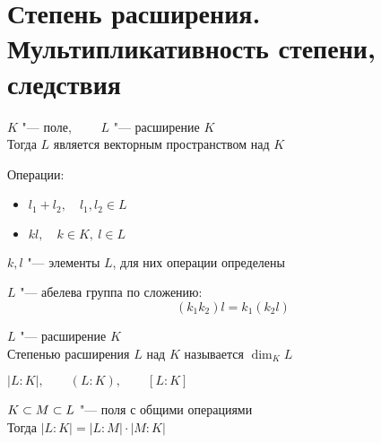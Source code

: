 \section{Степень расширения. Мультипликативность степени, следствия}

\begin{lemma}[корректность]
	$ K $ "--- поле, $ \qquad L $ "--- расширение $ K $ \\
	Тогда $ L $ является векторным пространством над $ K $
\end{lemma}

\begin{iproof}
	\item Операции:
	\begin{itemize}
		\item $ l_1 + l_2, \quad l_1, l_2 \in L $
		\item $ kl, \quad k \in K, ~ l \in L $
	\end{itemize}
	$ k, l $ "--- элементы $ L $, для них операции определены
	\item $ L $ "--- абелева группа по сложению:
	$$ (k_1k_2)l = k_1(k_2l) $$
\end{iproof}

\begin{definition}
	$ L $ "--- расширение $ K $ \\
	Степенью расширения $ L $ над $ K $ называется $ \dim_K L $
\end{definition}

\begin{notation}
	$ |L : K|, \qquad (L : K), \qquad [L : K] $
\end{notation}

\begin{theorem}
	$ K \subset M \subset L $ "--- поля с общими операциями \\
	Тогда $ |L : K| = |L : M| \cdot |M : K| $
\end{theorem}

